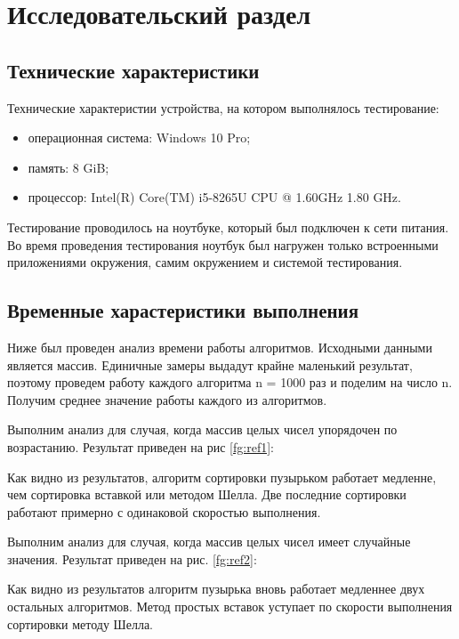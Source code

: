 \chapter{Исследовательский раздел}
\section{Технические характеристики}
Технические характеристии устройства, на котором выполнялось тестирование:
\begin{itemize}
	\item операционная система: Windows 10 Pro;
	\item память: 8 GiB;
	\item процессор: Intel(R) Core(TM) i5-8265U CPU @ 1.60GHz   1.80 GHz.
\end{itemize}
Тестирование проводилось на ноутбуке, который был подключен к сети питания. Во время проведения тестирования ноутбук был нагружен только встроенными приложениями окружения, самим окружением и системой тестирования.

\section{Временные харастеристики выполнения}
Ниже был проведен анализ времени работы алгоритмов. Исходными данными является массив. Единичные замеры выдадут крайне маленький результат, поэтому  проведем работу каждого алгоритма n = 1000 раз и поделим на число n. Получим среднее значение работы каждого из алгоритмов. 

Выполним анализ для случая, когда массив целых чисел упорядочен по возрастанию. Результат приведен на рис \ref{fg:ref1}:

\begin{figure}[H]
\end{figure} 

Как видно из результатов, алгоритм сортировки пузырьком работает медленне, чем сортировка вставкой или методом Шелла. Две последние сортировки работают примерно с одинаковой скоростью выполнения. 

Выполним анализ для случая, когда массив целых чисел имеет случайные значения. Результат приведен на рис. \ref{fg:ref2}:
\begin{figure}[H]
\end{figure}
Как видно из результатов алгоритм пузырька вновь работает медленнее двух остальных алгоритмов. Метод простых вставок уступает по скорости выполнения сортировки методу Шелла. 

